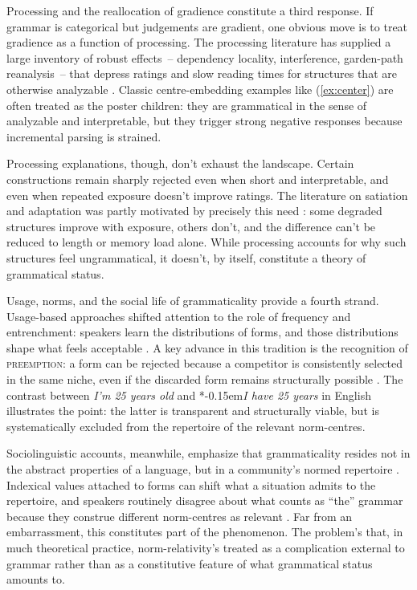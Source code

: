 \documentclass[12pt,letterpaper]{article}
\newcommand{\term}[1]{\textsc{#1}}
\newcommand{\mention}[1]{\textit{#1}}
\newcommand{\judgesep}{\kern-0.15em}
\newcommand{\ungram}[1]{*\judgesep#1}
\begin{document}
Processing and the reallocation of gradience constitute a third response. If grammar is categorical but judgements are gradient, one obvious move is to treat gradience as a function of processing. The processing literature has supplied a large inventory of robust effects~-- dependency locality, interference, garden-path reanalysis~-- that depress ratings and slow reading times for structures that are otherwise analyzable \autocite{gibson2000, GrodnerGibson2005, hawkins2004, gibson2025}. Classic centre-embedding examples like (\ref{ex:center}) are often treated as the poster children: they are grammatical in the sense of analyzable and interpretable, but they trigger strong negative responses because incremental parsing is strained.

Processing explanations, though, don't exhaust the landscape. Certain constructions remain sharply rejected even when short and interpretable, and even when repeated exposure doesn't improve ratings. The literature on satiation and adaptation was partly motivated by precisely this need \autocite{snyder2000grammaticality, Snyder2022}: some degraded structures improve with exposure, others don't, and the difference can't be reduced to length or memory load alone. While processing accounts for why such structures feel ungrammatical, it doesn't, by itself, constitute a theory of grammatical status.

Usage, norms, and the social life of grammaticality provide a fourth strand. Usage-based approaches shifted attention to the role of frequency and entrenchment: speakers learn the distributions of forms, and those distributions shape what feels acceptable \autocite{bybee2006, bybee2010}. A key advance in this tradition is the recognition of \term{preemption}: a form can be rejected because a competitor is consistently selected in the same niche, even if the discarded form remains structurally possible \autocite{Goldberg2011}. The contrast between \mention{I'm 25 years old} and \ungram{\mention{I have 25 years}} in English illustrates the point: the latter is transparent and structurally viable, but is systematically excluded from the repertoire of the relevant norm-centres.

Sociolinguistic accounts, meanwhile, emphasize that grammaticality resides not in the abstract properties of a language, but in a community's normed repertoire \autocite{labov1972}. Indexical values attached to forms can shift what a situation admits to the repertoire, and speakers routinely disagree about what counts as \enquote{the} grammar because they construe different norm-centres as relevant \autocite{Silverstein1976, Eckert2012}. Far from an embarrassment, this constitutes part of the phenomenon. The problem's that, in much theoretical practice, norm-relativity's treated as a complication external to grammar rather than as a constitutive feature of what grammatical status amounts to.
\end{document}
